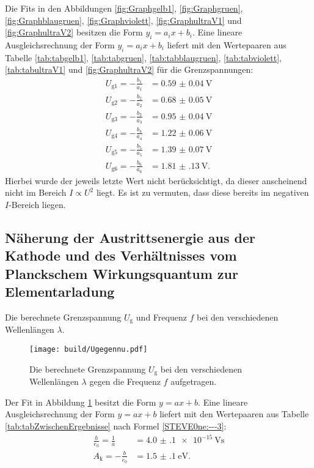 \FloatBarrier

Die Fits in den Abbildungen \ref{fig:Graphgelb1}, \ref{fig:Graphgruen}, \ref{fig:Graphblaugruen}, \ref{fig:Graphviolett}, \ref{fig:GraphultraV1} und \ref{fig:GraphultraV2} besitzen die Form $y_i=a_i x + b_i$. Eine lineare Ausgleichsrechnung der Form $y_i=a_i x+b_i$ liefert mit den Wertepaaren aus Tabelle \ref{tab:tabgelb1}, \ref{tab:tabgruen}, \ref{tab:tabblaugruen}, \ref{tab:tabviolett}, \ref{tab:tabultraV1} und \ref{fig:GraphultraV2} für die Grenzspannungen:
\begin{align}
	U_{\text{g}1} = -\frac{b_1}{a_1} &= \SI{0.59(4)}{\volt}\\
	U_{\text{g}2} = -\frac{b_2}{a_2} &= \SI{0.68(5)}{\volt}\\
	U_{\text{g}3} = -\frac{b_3}{a_3} &= \SI{0.95(4)}{\volt}\\
	U_{\text{g}4} = -\frac{b_4}{a_4} &= \SI{1.22(6)}{\volt}\\
	U_{\text{g}5} = -\frac{b_5}{a_5} &= \SI{1.39(7)}{\volt}\\
	U_{\text{g}6} = -\frac{b_6}{a_6} &= \SI{1.81(13)}{\volt}\text{.}
\end{align}
Hierbei wurde der jeweils letzte Wert nicht berücksichtigt, da dieser anscheinend nicht im Bereich $I\propto U^2$ liegt.
Es ist zu vermuten, dass diese bereits im negativen $I$-Bereich liegen.

\subsection{Näherung der Austrittsenergie aus der Kathode und des Verhältnisses vom Planckschem Wirkungsquantum zur Elementarladung}
\begin{table}
	\centering
	\caption{Die berechnete Grenzspannung $U_\text{g}$ und Frequenz $f$ bei den verschiedenen Wellenlängen $\lambda$.}
  	
\end{table}
\begin{figure}
	\centering
	\caption{Die berechnete Grenzspannung $U_\text{g}$ bei den verschiedenen Wellenlängen $\lambda$ gegen die Frequenz $f$ aufgetragen.}
	\texttt{[image: build/Ugegennu.pdf]}
	\label{fig:GraphUgegennu}
\end{figure}
Der Fit in Abbildung \ref{fig:GraphUgegennu} besitzt die Form $y=a x + b$. Eine lineare Ausgleichsrechnung der Form $y=a x + b$ liefert mit den Wertepaaren aus Tabelle \ref{tab:tabZwischenErgebnisse} nach Formel \eqref{STEVE0ne:---3}:
\begin{align}
	\frac{h}{e_0}=\frac{1}{a} &= \SI{4.0(1)e-15}{\volt\second}\\
	A_\text{k}=-\frac{b}{e_0} &= \SI{1.5(1)}{\electronvolt}\text{.}
\end{align}


